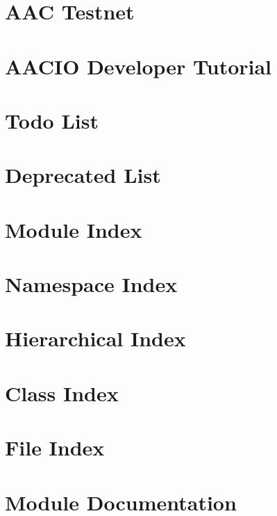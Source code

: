 \documentclass[twoside]{book}
\newcommand{\+}{\discretionary{\mbox{\scriptsize$\hookleftarrow$}}{}{}}
\begin{document}
\chapter{A\+AC Testnet}
\label{md_testnet}

\chapter{A\+A\+C\+IO Developer Tutorial}
\label{md__t_u_t_o_r_i_a_l}

\chapter{Todo List}
\label{todo}

\chapter{Deprecated List}
\label{deprecated}

\chapter{Module Index}

\chapter{Namespace Index}

\chapter{Hierarchical Index}

\chapter{Class Index}

\chapter{File Index}

\chapter{Module Documentation}






































\end{document}
